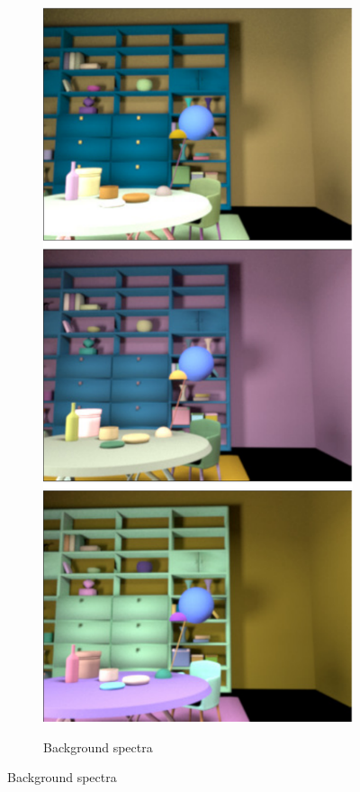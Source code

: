 \documentclass{jov}
\begin{document}
\begin{figure}
\begin{subfigure}{0.18 \textwidth}
        \label{fig:illuminationVariation}
    \end{subfigure}
          ~  
    \begin{subfigure}{0.18 \textwidth}
    \centering
        \caption{Background spectra}
        \includegraphics[width=\textwidth]{../FiguresDraft5/Figure4/Figure4_e.pdf}
        \label{fig:backGroundVariation}
    \end{subfigure}


\end{figure}
\end{document}
